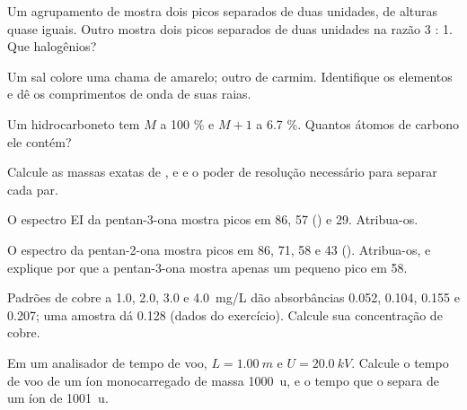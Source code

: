 \begin{exercise}[$\star$]\label{exo:b2:mass-spec-atomic:3}
Um agrupamento de  mostra dois picos separados de duas unidades, de alturas quase iguais.
Outro mostra dois picos separados de duas unidades na razão 3 : 1. Que halogênios?
\end{exercise}

\begin{exercise}[$\star$]\label{exo:b2:mass-spec-atomic:4}
Um sal colore uma chama de amarelo; outro de carmim. Identifique os elementos e dê os comprimentos de
onda de suas raias.
\end{exercise}

\begin{exercise}[$\star\star$]\label{exo:b2:mass-spec-atomic:5}
Um hidrocarboneto tem $M$ a 100 \% e $M+1$ a 6.7 \%. Quantos átomos de carbono ele contém?
\end{exercise}

\begin{exercise}[$\star\star$]\label{exo:b2:mass-spec-atomic:6}
Calcule as massas exatas de ,  e  e o poder de resolução necessário para separar
cada par.
\end{exercise}

\begin{exercise}[$\star\star$]\label{exo:b2:mass-spec-atomic:7}
O espectro EI da pentan-3-ona mostra picos em 86, 57 () e 29. Atribua-os.
\end{exercise}

\begin{exercise}[$\star\star$]\label{exo:b2:mass-spec-atomic:8}
O espectro da pentan-2-ona mostra picos em 86, 71, 58 e 43 (). Atribua-os, e explique por
que a pentan-3-ona mostra apenas um pequeno pico em 58.
\end{exercise}

\begin{exercise}[$\star\star$]\label{exo:b2:mass-spec-atomic:9}
Padrões de cobre a 1.0, 2.0, 3.0 e \qty{4.0}{mg/L} dão absorbâncias 0.052, 0.104, 0.155 e 0.207;
uma amostra dá 0.128 (dados do exercício). Calcule sua concentração de cobre.
\end{exercise}

\begin{exercise}[$\star\star\star$]\label{exo:b2:mass-spec-atomic:10}
Em um analisador de tempo de voo, $L = \qty{1.00}{m}$ e $U = \qty{20.0}{kV}$. Calcule o tempo de voo
de um íon monocarregado de massa \qty{1000}{u}, e o tempo que o separa de um íon de \qty{1001}{u}.
\end{exercise}

